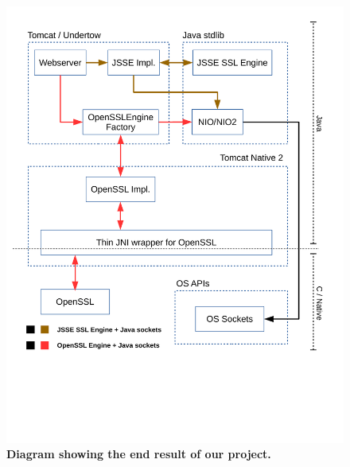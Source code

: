 \documentclass[11pt,a4paper,bibliography=totocnumbered]{scrartcl}
\begin{document}
\begin{figure}[!h]
	\begin{center}
		\includegraphics[scale=0.7]{diagram_goal.pdf}
	\end{center}
	\caption{\textbf{Diagram showing the end result of our project.}}
	\label{fig:goal}
\end{figure}

\FloatBarrier
\end{document}
